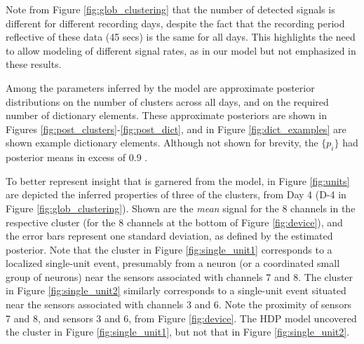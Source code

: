 \documentclass[journal]{IEEEtran}
\begin{document}
Note from Figure \ref{fig:glob_clustering} that the number of
detected signals is different for different recording days, despite
the fact that the recording period reflective of these data (45
secs) is the same for all days. This highlights the need to allow
modeling of different signal rates, as in our model but not
emphasized in these results.

Among the parameters inferred by the model are approximate posterior
distributions on the number of clusters across all days, and on the
required number of dictionary elements. These approximate posteriors
are shown in Figures \ref{fig:post_clusters}-\ref{fig:post_dict},
and in Figure \ref{fig:dict_examples} are shown example dictionary
elements. Although not shown for brevity, the $\{p_i\}$ had posterior means in excess of 0.9 .



To better represent insight that is garnered from the model, in Figure \ref{fig:units} are depicted the inferred properties of three of the clusters, from Day 4 (D-4 in Figure \ref{fig:glob_clustering}). Shown are the \emph{mean} signal for the 8 channels in the respective cluster (for the 8 channels at the bottom of Figure \ref{fig:device}), and the error bars represent one standard deviation, as defined by the estimated posterior. Note that the cluster in Figure \ref{fig:single_unit1} corresponds to a localized single-unit event, presumably from a neuron (or a coordinated small group of neurons) near the sensors associated with channels 7 and 8. The cluster in Figure \ref{fig:single_unit2} similarly corresponds to a single-unit event situated near the sensors associated with channels 3 and 6. Note the proximity of sensors 7 and 8, and sensors 3 and 6, from Figure \ref{fig:device}. The HDP model uncovered the cluster in Figure \ref{fig:single_unit1}, but not that in Figure \ref{fig:single_unit2}.
\end{document}
